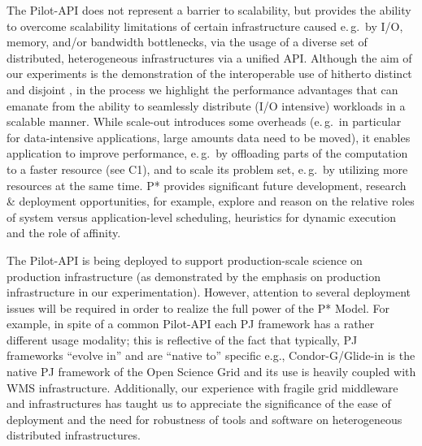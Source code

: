 \documentclass[conference]{IEEEtran}
\begin{document}
The Pilot-API does not represent a barrier to scalability, but
provides the ability to overcome scalability limitations of certain
infrastructure caused e.\,g.\ by I/O, memory, and/or bandwidth
bottlenecks, via the usage of a diverse set of distributed,
heterogeneous infrastructures via a unified API.  Although the aim of
our experiments is the demonstration of the interoperable use of
hitherto distinct and disjoint \pilotjobs, in the process we highlight
the performance advantages that can emanate from the ability to
seamlessly distribute (I/O intensive) workloads in a scalable manner.
While scale-out introduces some overheads (e.\,g.\ in particular for
data-intensive applications, large amounts data need to be moved), it
enables application to improve performance, e.\,g.\ by offloading
parts of the computation to a faster resource (see C1), and to scale
its problem set, e.\,g.\ by utilizing more resources at the same time.
P* provides significant future development, research \& deployment
opportunities, for example, explore and reason on the relative roles
of system versus application-level scheduling, heuristics for dynamic
execution and the role of affinity.  





The Pilot-API is being deployed to support production-scale science on
production infrastructure (as demonstrated by the emphasis on
production infrastructure in our experimentation).
However, attention to several deployment issues will be required in
order to realize the full power of the P* Model.  For example, in
spite of a common Pilot-API each PJ framework has a rather different
usage modality; this is reflective of the fact that typically, PJ
frameworks ``evolve in'' and are ``native to'' specific e.g.,
Condor-G/Glide-in is the native PJ framework of the Open Science Grid
and its use is heavily coupled with WMS infrastructure.  Additionally,
our experience with fragile grid middleware and infrastructures has
taught us to appreciate the significance of the ease of deployment and
the need for robustness of tools and software on heterogeneous
distributed infrastructures.
\end{document}
